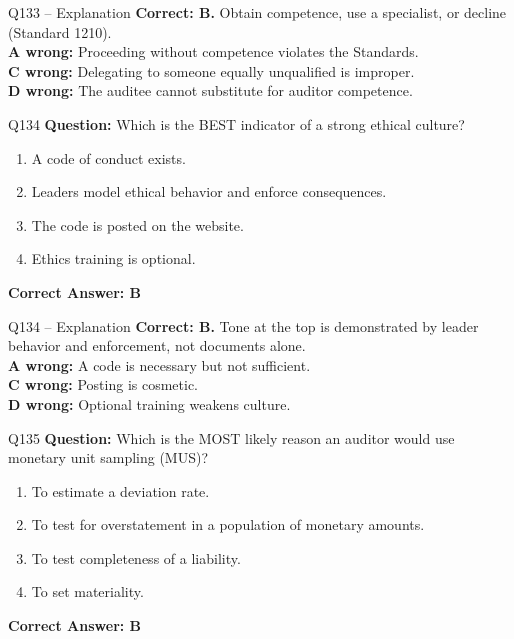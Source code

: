 \documentclass[aspectratio=169,10pt]{beamer}
\begin{document}
	\begin{frame}[t]{Q133 -- Explanation}
		\small
		\textbf{Correct: B.} Obtain competence, use a specialist, or decline (Standard 1210). \\[4pt]
		\textbf{A wrong:} Proceeding without competence violates the Standards. \\[2pt]
		\textbf{C wrong:} Delegating to someone equally unqualified is improper. \\[2pt]
		\textbf{D wrong:} The auditee cannot substitute for auditor competence.
	\end{frame}
	
	\begin{frame}[t]{Q134}
		\small
		\textbf{Question:} Which is the BEST indicator of a strong ethical culture?
		\begin{enumerate}[label=\Alph*.,itemsep=1pt,topsep=2pt]
			\item A code of conduct exists.
			\item Leaders model ethical behavior and enforce consequences.
			\item The code is posted on the website.
			\item Ethics training is optional.
		\end{enumerate}
		\vspace{4pt}
		\textbf{Correct Answer: B}
	\end{frame}
	
	\begin{frame}[t]{Q134 -- Explanation}
		\small
		\textbf{Correct: B.} Tone at the top is demonstrated by leader behavior and enforcement, not documents alone. \\[4pt]
		\textbf{A wrong:} A code is necessary but not sufficient. \\[2pt]
		\textbf{C wrong:} Posting is cosmetic. \\[2pt]
		\textbf{D wrong:} Optional training weakens culture.
	\end{frame}
	
	\begin{frame}[t]{Q135}
		\small
		\textbf{Question:} Which is the MOST likely reason an auditor would use monetary unit sampling (MUS)?
		\begin{enumerate}[label=\Alph*.,itemsep=1pt,topsep=2pt]
			\item To estimate a deviation rate.
			\item To test for overstatement in a population of monetary amounts.
			\item To test completeness of a liability.
			\item To set materiality.
		\end{enumerate}
		\vspace{4pt}
		\textbf{Correct Answer: B}
	\end{frame}
	
\end{document}
